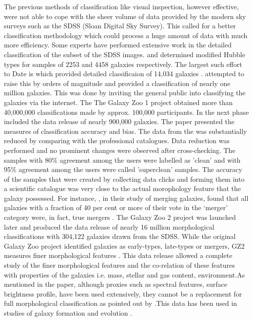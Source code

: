 \documentclass[fleqn,usenatbib]{mnras}
\begin{document}
The previous methods of classification like visual inspection, however effective, were not able to cope with the sheer volume of data provided by the modern sky surveys such as the SDSS (Sloan Digital Sky Survey). This called for a better classification methodology which could process a huge amount of data with much more efficiency. Some experts have performed extensive work in the detailed classification of the subset of the SDSS images. \citet{2007AJ....134..579F} and \citet{refId0} determined modified Hubble types for samples of 2253 and 4458 galaxies respectively. The largest such effort to Date is \citet{2010ApJS..186..427N} which provided detailed classificaion of 14,034 galaxies \citep{Willett_2013}. \citet{2008MNRAS.389.1179L} attempted to raise this by orders of magnitude and provided a classification of nearly one million galaxies. This was done by inviting the general public into classifying the galaxies via the internet. The The Galaxy Zoo 1 project obtained more than 40,000,000 classifications made by approx. 100,000 participants. In the next phase \citet{Lintott_2010} included the data release of nearly 900,000 galaxies. The paper presented the measures of classification accuracy and bias. The data from the \citet{2008MNRAS.389.1179L} was substantially reduced by comparing with the professional catalogues. Data reduction was performed and no prominent changes were observed after cross-checking. The samples with 80\% agreement among the users were labelled as 'clean' and with 95\% agreement among the users were called 'superclean' samples. The accuracy of the samples that were created by collecting data clicks and forming them into a scientific catalogue was very close to the actual morophology feature that the galaxy possessed. For instance, \citet{2010MNRAS.401.1552D}, in their study of merging galaxies, found that
all galaxies with a fraction of 40 per cent or more of their vote in the
‘merger’ category were, in fact, true mergers \citep{Lintott_2010}. The Galaxy Zoo 2 project was launched later and \citet{Willett_2013} produced the data release of nearly 16 million morphological classifications with 304,122 galaxies drawn from the SDSS. While the original Galaxy Zoo project identified galaxies as early-types, late-types or mergers, GZ2 measures finer morphological features \citep{Willett_2013}. This data release allowed a complete study of the finer morphological features and the co-relation of these features with properties of the galaxies i.e. mass, stellar and gas content, environment.As mentioned in the paper, although proxies such as spectral features, surface brightness profile, have been used extensively, they cannot be a replacement for full morphological classification as pointed out by \citet{Lintott_2010}.This data has been used in studies of galaxy formation and evolution \citep{Land_et_all_2008,Schawinski,Willett_2015}.
\end{document}
